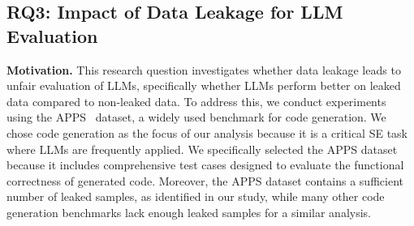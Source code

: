 \subsection{RQ3: Impact of Data Leakage for LLM Evaluation}



\noindent
\textbf{Motivation.}
This research question investigates whether data leakage leads to unfair evaluation of LLMs, specifically whether LLMs perform better on leaked data compared to non-leaked data. To address this, we conduct experiments using the APPS~\cite{hendrycks2021measuring} dataset, a widely used benchmark for code generation. We chose code generation as the focus of our analysis because it is a critical SE task where LLMs are frequently applied. We specifically selected the APPS dataset because it includes comprehensive test cases designed to evaluate the functional correctness of generated code. Moreover, the APPS dataset contains a sufficient number of leaked samples, as identified in our study, while many other code generation benchmarks lack enough leaked samples for a similar analysis.


\begin{table*}[b]
\centering
\vspace{-0.2cm}
\caption{Effectiveness of LLMs on Leaked and Non-Leaked Subsets of APPS}
\vspace{-0.2cm}
\label{table:rq3}
\end{table*}


